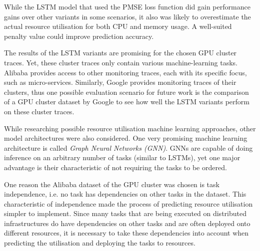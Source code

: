         While the LSTM model that used the PMSE loss function did gain performance gains over other variants in some scenarios, it also was likely to overestimate the actual resource utilisation for both CPU and memory usage.
        A well-suited penalty value could improve prediction accuracy.

        The results of the LSTM variants are promising for the chosen GPU cluster traces. 
        Yet, these cluster traces only contain various machine-learning tasks. 
        Alibaba provides access to other monitoring traces, each with its specific focus, such as micro-services.
        Similarly, Google provides monitoring traces of their clusters, thus one possible evaluation scenario for future work is the comparison of a GPU cluster dataset by Google to see how well the LSTM variants perform on these cluster traces.

        While researching possible resource utilisation machine learning approaches, other model architectures were also considered.
        One very promising machine learning architecture is called \emph{Graph Neural Networks (GNN)}.
        GNNs are capable of doing inference on an arbitrary number of tasks (similar to LSTMs), yet one major advantage is their characteristic of not requiring the tasks to be ordered.

        One reason the Alibaba dataset of the GPU cluster was chosen is task independence, i.e. no task has dependencies on other tasks in the dataset.
        This characteristic of independence made the process of predicting resource utilisation simpler to implement.
        Since many tasks that are being executed on distributed infrastructures do have dependencies on other tasks and are often deployed onto different resources, it is necessary to take these dependencies into account when predicting the utilisation and deploying the tasks to resources.

        
            



